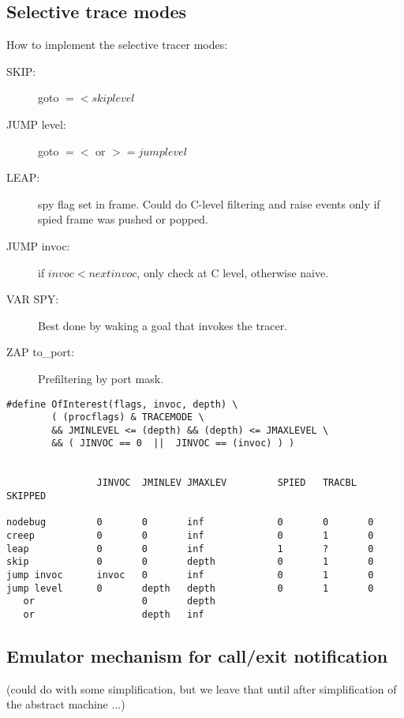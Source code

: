 \subsection{Selective trace modes}

How to implement the selective tracer modes:
\begin{description}
\item[SKIP:]
goto $=< skiplevel$

\item[JUMP level:]
goto $=<$ or $>= jumplevel$

\item[LEAP:]
spy flag set in frame. Could do C-level filtering and raise events
only if spied frame was pushed or popped.

\item[JUMP invoc:]
if $invoc < nextinvoc$, only check at C level, otherwise naive.

\item[VAR SPY:]
Best done by waking a goal that invokes the tracer.

\item[ZAP to_port:]
Prefiltering by port mask.
\end{description}

\begin{verbatim}
#define OfInterest(flags, invoc, depth) \
        ( (procflags) & TRACEMODE \
        && JMINLEVEL <= (depth) && (depth) <= JMAXLEVEL \
        && ( JINVOC == 0  ||  JINVOC == (invoc) ) )


                JINVOC  JMINLEV JMAXLEV         SPIED   TRACBL  SKIPPED

nodebug         0       0       inf             0       0       0
creep           0       0       inf             0       1       0
leap            0       0       inf             1       ?       0
skip            0       0       depth           0       1       0
jump invoc      invoc   0       inf             0       1       0
jump level      0       depth   depth           0       1       0
   or                   0       depth
   or                   depth   inf
\end{verbatim}



\subsection{Emulator mechanism for call/exit notification}

(could do with some simplification, but we leave that until after
simplification of the abstract machine ...)

